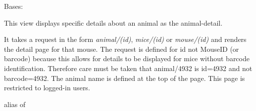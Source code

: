\documentclass[letterpaper,10pt,english]{sphinxmanual}
\begin{document}

\begin{fulllineitems}
\label{api:mousedb.animal.views.AnimalDetail}
Bases: {\hyperref[api:mousedb.views.ProtectedDetailView]{}}

This view displays specific details about an animal as the animal-detail.

It takes a request in the form \emph{animal/(id)}, \emph{mice/(id)} or \emph{mouse/(id)} and renders the detail page for that mouse.  The request is defined for id not MouseID (or barcode) because this allows for details to be displayed for mice without barcode identification.
Therefore care must be taken that animal/4932 is id=4932 and not barcode=4932.  The animal name is defined at the top of the page.
This page is restricted to logged-in users.

\begin{fulllineitems}
\label{api:mousedb.animal.views.AnimalDetail.context_object_name}
\end{fulllineitems}


\begin{fulllineitems}
\label{api:mousedb.animal.views.AnimalDetail.model}
alias of 

\end{fulllineitems}


\begin{fulllineitems}
\label{api:mousedb.animal.views.AnimalDetail.template_name}
\end{fulllineitems}


\end{fulllineitems}

\end{document}
